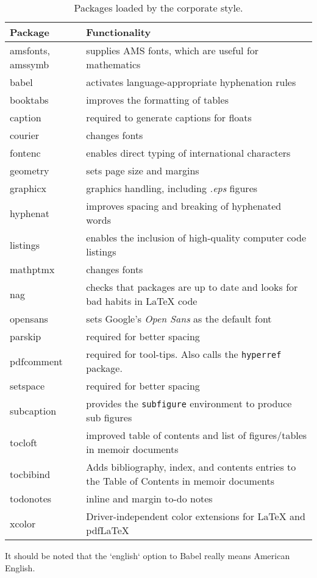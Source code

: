 \begin{table}[!ht]
\centering
\caption[Packages loaded by the corporate style]{Packages loaded by the corporate style.}
\label{tab:incpacks}
\begin{tabular}{p{}p{}}
\toprule
Package &  Functionality\\
\midrule
amsfonts, amssymb & supplies AMS fonts, which are useful for mathematics \\
babel &  activates language-appropriate hyphenation rules\\
booktabs & improves the formatting of tables \\
caption & required to generate captions for floats\\
courier& changes fonts \\
fontenc &  enables direct typing of international characters \\
geometry & sets page size and margins \\
graphicx & graphics handling, including \emph{.eps} figures \\
hyphenat & improves spacing and breaking of hyphenated words \\
listings & enables the inclusion of high-quality computer code listings\\
mathptmx& changes fonts \\
nag & checks that packages are up to date and looks for bad habits in LaTeX code\\
opensans& sets Google's \emph{Open Sans} as the default font\\
parskip & required for better spacing\\
pdfcomment & required for tool-tips. Also calls the \texttt{hyperref} package.\\
setspace & required for better spacing\\
subcaption & provides the \texttt{subfigure} environment to produce sub figures \\
tocloft & improved table of contents and list of figures/tables in memoir documents\\
tocbibind &  Adds bibliography, index, and contents entries to the Table of Contents in memoir documents\\
todonotes &  inline and margin to-do notes \\
xcolor &  Driver-independent color extensions for LaTeX and pdfLaTeX\\
\bottomrule
\end{tabular}
\end{table}

It should be noted that the `english` option to Babel really means American English.